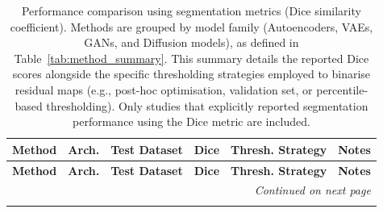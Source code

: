 \begin{longtable}{lp{1.2cm}lclp{5.5cm}}
\caption{Performance comparison using segmentation metrics (Dice similarity coefficient). Methods are grouped by model family (Autoencoders, VAEs, GANs, and Diffusion models), as defined in Table~\ref{tab:method_summary}. This summary details the reported Dice scores alongside the specific thresholding strategies employed to binarise residual maps (e.g., post-hoc optimisation, validation set, or percentile-based thresholding). Only studies that explicitly reported segmentation performance using the Dice metric are included.}
\label{tab:dice_summary}
\\
\toprule
\textbf{Method} & \textbf{Arch.} & \textbf{Test Dataset} & \textbf{Dice} & \textbf{Thresh. Strategy} & \textbf{Notes} \\
\midrule
\endfirsthead
\toprule
\textbf{Method} & \textbf{Arch.} & \textbf{Test Dataset} & \textbf{Dice} & \textbf{Thresh. Strategy} & \textbf{Notes} \\
\midrule
\endhead
\midrule
\multicolumn{6}{r}{\textit{Continued on next page}} \\
\midrule
\endfoot
\bottomrule
\endlastfoot


\end{longtable}
